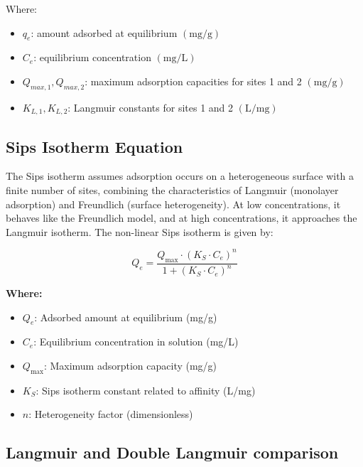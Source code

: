 \documentclass[journal=jacsat,manuscript=article]{achemso}
\begin{document}
Where:
\begin{itemize}
  \item \( q_e \): amount adsorbed at equilibrium \((\mathrm{mg/g})\)
  \item \( C_e \): equilibrium concentration \((\mathrm{mg/L})\)
  \item \(Q_{max,1}, Q_{max,2} \): maximum adsorption capacities for sites 1 and 2 \((\mathrm{mg/g})\)
  \item \( K_{L,1}, K_{L,2} \): Langmuir constants for sites 1 and 2 \((\mathrm{L/mg})\)
\end{itemize}

\subsection{Sips Isotherm Equation}
The Sips isotherm assumes adsorption occurs on a heterogeneous surface with a finite number of sites, combining the characteristics of Langmuir (monolayer adsorption) and Freundlich (surface heterogeneity). At low concentrations, it behaves like the Freundlich model, and at high concentrations, it approaches the Langmuir isotherm.
The non-linear Sips isotherm is given by:

\begin{equation}
Q_e = \frac{Q_{\text{max}} \cdot (K_{S} \cdot C_e)^n}{1 + (K_{S} \cdot C_e)^n}
\label{eq:SIPS_nonlin}
\end{equation}

\noindent
\textbf{Where:}
\begin{itemize}
    \item $Q_e$: Adsorbed amount at equilibrium (mg/g)
    \item $C_e$: Equilibrium concentration in solution (mg/L)
    \item $Q_{\text{max}}$: Maximum adsorption capacity (mg/g)
    \item $K_{S}$: Sips isotherm constant related to affinity (L/mg)
    \item $n$: Heterogeneity factor (dimensionless)
\end{itemize}


	

\subsection{Langmuir and Double Langmuir comparison} \label{section:L-DL_comparison}
\end{document}
